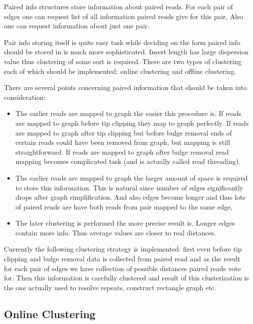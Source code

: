 \documentclass[14pt]{article}
\begin{document}
Paired info structures store information about paired reads. For each pair of edges one can request list of all information paired reads give for this pair, Also one can request information about just one pair.

Pair info storing itself is quite easy task while deciding on the form paired info should be stored in is much more sophisticated. Insert length has large dispersion value thus clustering of some sort is required. There are two types of clustering each of which should be implemented: online clustering and offline clustering.

There are several points concerning paired information that should be taken into consideration:

\begin{itemize}
\item The earlier reads are mapped to graph the easier this procedure is. If reads are mapped to graph before tip clipping they map to graph perfectly. If reads are mapped to graph after tip clipping but before bulge removal ends of certain reads could have been removed from graph, but mapping is still straightforward. If reads are mapped to graph after bulge removal read mapping becomes complicated task (and is actually called read threading).

\item The earlier reads are mapped to graph the larger amount of space is required to store this information. This is natural since number of edges significantly drops after graph simplification. And also edges become longer and thus lots of paired reads are have both reads from pair mapped to the same edge,

\item The later clustering is performed the more precise result is. Longer edges contain more info. Thus average values are closer to real distances.
\end{itemize}

Currently the following clustering strategy is implemented: first even before tip clipping and bulge removal data is collected from paired read and as the result for each pair of edges we have collection of possible distances paired reads vote for. Then this information is carefully clustered and result of this clusterization is the one actually used to resolve repeats, construct rectangle graph etc.

\subsection{Online Clustering}
\end{document}
